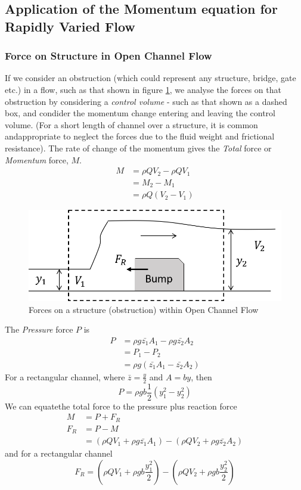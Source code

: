 \documentclass[a4paper, 12pt, british]{article} %
\numberwithin{equation}{section}
\numberwithin{figure}{section}
\numberwithin{table}{section}
\begin{document}
\subsection{Application of the Momentum equation for Rapidly Varied Flow}
\subsubsection{Force on Structure in Open Channel Flow}
\label{sec:force_on_struct}
If we consider an obstruction (which could represent any structure, bridge, gate etc.) in a flow, such as that shown in figure \ref{fig:1112a}, we analyse the forces on that obstruction by considering a \textit{control volume} - such as that shown as a dashed box, and condider the momentum change entering and leaving the control volume. (For a short length of channel over a structure, it is common andappropriate to neglect the forces due to the fluid weight and frictional resistance). The rate of change of the momentum gives the \textit{Total} force or \textit{Momentum} force, $M$.
\begin{align*}
M &= \rho Q V_2 - \rho Q V_1 \\
 &= M_2 - M_1\\
 &=\rho Q (V_2 - V_1)
\end{align*}
\begin{figure}[H]
	\centering
	\includegraphics[scale=0.7]{./images/force_on_bump.png}
	\caption{Forces on a structure (obstruction) within Open Channel Flow}
	\label{fig:1112a}
\end{figure} 
The \textit{Pressure} force $P$ is
\begin{align*}
P &= \rho g \bar{z_1} A_1 - \rho g \bar{z_2} A_2 \\
  &= P_1 - P_2 \\
  &= \rho g (\bar{z_1} A_1 - \bar{z_2} A_2)
\label{eq:1112b}
\end{align*}
For a rectangular channel, where $\bar{z} = \frac{y}{2}$ and $A=by$, then
\begin{equation*}
P = \rho g b\frac{1}{2}(y^2_1 - y^2_2)
\label{eq:1112c}
\end{equation*}
We can equatethe total force to the pressure plus reaction force
\begin{align*}
M &= P + F_R \\
F_R  &= P - M \\
  &= \left(\rho Q V_1+ \rho g \bar{z_1} A_1 \right)  - \left( \rho Q V_2 + \rho g \bar{z_2} A_2\right)
\end{align*}
and for a rectangular channel
\begin{equation}
F_R  = \left(\rho Q V_1+ \rho g b\frac{y^2_1}{2}  \right)  - \left( \rho Q V_2 + \rho g b\frac{y^2_2}{2} \right)
\label{eq:force_on_structure}
\end{equation}
\end{document}
